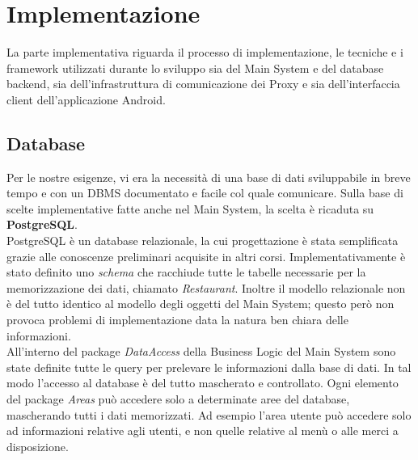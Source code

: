 \chapter{Implementazione}
La parte implementativa riguarda il processo di implementazione, le tecniche e i framework utilizzati durante lo sviluppo sia del Main System e del database backend, sia dell'infrastruttura di comunicazione dei Proxy e sia dell'interfaccia client dell'applicazione Android. 

\section{Database}
Per le nostre esigenze, vi era la necessità di una base di dati sviluppabile in breve tempo e con un DBMS documentato e facile col quale comunicare. Sulla base di scelte implementative fatte anche nel Main System, la scelta è ricaduta su \textbf{PostgreSQL}. 
\\PostgreSQL è un database relazionale, la cui progettazione è stata semplificata grazie alle conoscenze preliminari acquisite in altri corsi. Implementativamente è stato definito uno \textit{schema} che racchiude tutte le tabelle necessarie per la memorizzazione dei dati, chiamato \textit{Restaurant}. Inoltre il modello relazionale non è del tutto identico al modello degli oggetti del Main System; questo però non provoca problemi di implementazione data la natura ben chiara delle informazioni.
\vspace{0.5cm}
\\All'interno del package \textit{DataAccess} della Business Logic del Main System sono state definite tutte le query per prelevare le informazioni dalla base di dati. In tal modo l'accesso al database è del tutto mascherato e controllato. Ogni elemento del package \textit{Areas} può accedere solo a determinate aree del database, mascherando tutti i dati memorizzati. Ad esempio l'area utente può accedere solo ad informazioni relative agli utenti, e non quelle relative al menù o alle merci a disposizione.

